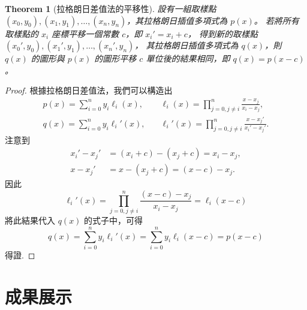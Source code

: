 \documentclass[a4paper,  10pt, oneside, fleqn]{article}
\newtheorem{theorem}{Theorem}
\begin{document}
\begin{theorem}[拉格朗日差值法的平移性]
    \label{thm:lagrange-translation}
    設有一組取樣點 $(x_0, y_0), (x_1, y_1), \ldots, (x_n, y_n)$，其拉格朗日插值多項式為 $p(x)$。
    若將所有取樣點的 $x_i$ 座標平移一個常數 $c$，即 $x_i' = x_i + c$，
    得到新的取樣點 $(x_0', y_0), (x_1', y_1), \ldots, (x_n', y_n)$，
    其拉格朗日插值多項式為 $q(x)$，則 $q(x)$ 的圖形與 $p(x)$ 的圖形平移 $c$ 單位後的結果相同，即 $q(x) = p(x - c)$。
\end{theorem}

\begin{proof}
    根據拉格朗日差值法，我們可以構造出
    \begin{align}
        p(x) = \sum_{i=0}^{n} y_i \ell_i(x), \quad  &
        \ell_i(x) = \prod_{j=0, j \neq i}^{n} \frac{x - x_j}{x_i - x_j},
        \\
        q(x) = \sum_{i=0}^{n} y_i \ell_i'(x), \quad &
        \ell_i'(x) = \prod_{j=0, j \neq i}^{n} \frac{x - x_j'}{x_i' - x_j'}.
    \end{align}
    注意到
    \begin{align}
        x_i' - x_j' & = (x_i + c) - (x_j + c) = x_i - x_j, \\
        x - x_j'    & = x - (x_j + c) = (x - c) - x_j.
    \end{align}
    因此
    \begin{equation}
        \ell_i'(x) = \prod_{j=0, j \neq i}^{n} \frac{(x - c) - x_j}{x_i - x_j} = \ell_i(x - c)
    \end{equation}
    將此結果代入 $q(x)$ 的式子中，可得
    \begin{equation}
        q(x) = \sum_{i=0}^{n} y_i \ell_i'(x) = \sum_{i=0}^{n} y_i \ell_i(x - c) = p(x - c)
    \end{equation}
    得證.
\end{proof}


\section*{成果展示}
\end{document}
